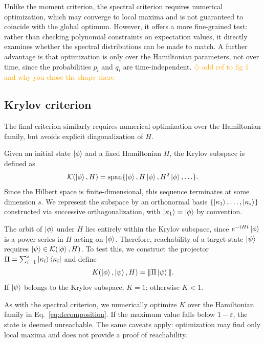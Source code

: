 \documentclass[aps,prx,reprint,superscriptaddress,footnote, twocolumn,notitlepage]{revtex4-2}
\newcommand{\ko}[1]{\textcolor{orange}{#1}}
\newcommand{\todoko}[1]{\ko{$\diamondsuit$ #1}}
\begin{document}
Unlike the moment criterion, the spectral criterion requires numerical optimization, which may converge to local maxima and is not guaranteed to coincide with the global optimum. However, it offers a more fine-grained test: rather than checking polynomial constraints on expectation values, it directly examines whether the spectral distributions can be made to match. A further advantage is that optimization is only over the Hamiltonian parameters, not over time, since the probabilities $p_i$ and $q_i$ are time-independent.
\todoko{add ref to fig 1 and why you chose the shape there}

\subsection{Krylov criterion} \label{ssec:kryl}
The final criterion similarly requires numerical optimization over the Hamiltonian family, but avoids explicit diagonalization of $H$.

Given an initial state $\ket{\phi}$ and a fixed Hamiltonian $H$, the Krylov subspace is defined as
\begin{equation}
    \mathcal{K}(\ket{\phi}, H) = \mathrm{span}\{\ket{\phi}, H\ket{\phi}, H^2\ket{\phi}, \ldots\}.
\end{equation}
Since the Hilbert space is finite-dimensional, this sequence terminates at some dimension $s$. We represent the subspace by an orthonormal basis $\{\ket{\kappa_1}, \ldots, \ket{\kappa_s}\}$ constructed via successive orthogonalization, with $\ket{\kappa_1} = \ket{\phi}$ by convention.

The orbit of $\ket{\phi}$ under $H$ lies entirely within the Krylov subspace, since $e^{-iHt}\ket{\phi}$ is a power series in $H$ acting on $\ket{\phi}$. Therefore, reachability of a target state $\ket{\psi}$ requires $\ket{\psi} \in \mathcal{K}(\ket{\phi}, H)$. To test this, we construct the projector $\Pi = \sum_{i=1}^{s} \ket{\kappa_i}\bra{\kappa_i}$ and define
\begin{equation} \label{eq:krylfom}
    K(\ket{\phi}, \ket{\psi}, H) = \| \Pi \ket{\psi} \|. 
\end{equation}
If $\ket{\psi}$ belongs to the Krylov subspace, $K = 1$; otherwise $K < 1$.

As with the spectral criterion, we numerically optimize $K$ over the Hamiltonian family in Eq.~\eqref{eq:decomposition}. If the maximum value falls below $1 - \varepsilon$, the state is deemed unreachable. The same caveats apply: optimization may find only local maxima and does not provide a proof of reachability.%
\end{document}
